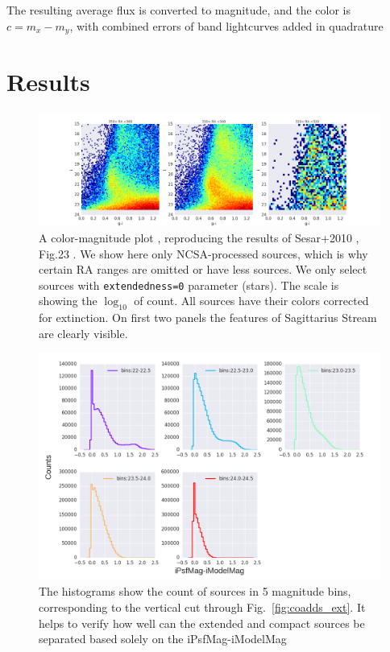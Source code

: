 \documentclass[fleqn,usenatbib]{mnras}  %
\begin{document}
The resulting average flux is converted to magnitude, and the color is  $c = m_{x}-m_{y}$, with combined errors of band lightcurves added in quadrature




\section{Results}
\label{sec:results}


\begin{figure}
\label{fig:colors_example}
\includegraphics[width=\textwidth]{Fig_g-i_vs_i_ra_310-360hist_n_50row_ext_0.png}
\cprotect\caption{A color-magnitude plot , reproducing the results of Sesar+2010 , Fig.23 .  We show here only NCSA-processed sources, which is why certain RA ranges are omitted or have less sources. We only select sources with \verb|extendedness=0| parameter (stars).  The scale is showing the $\log_{10}$ of count. All sources have their  colors corrected for extinction. On first two panels the features of Sagittarius Stream are clearly visible. }
\end{figure}
% 



\begin{figure}
\label{fig:coadds_ext_hist}
 \includegraphics[width=\textwidth]{Extendedness_coadd_histograms.png}
 \caption{The histograms show the count of sources in 5 magnitude bins, corresponding to the vertical cut through Fig.~\ref{fig:coadds_ext}. It helps to verify how well can the extended and compact sources be separated based solely on the iPsfMag-iModelMag}
\end{figure}
\end{document}
